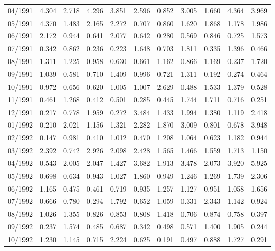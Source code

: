 \begin{tabular}{lrrrrrrrrrr}
04/1991 &  4.304 &  2.718 &  4.296 &  3.851 &  2.596 &  0.852 &  3.005 &  1.660 &  4.364 &  3.969 \\
05/1991 &  4.370 &  1.483 &  2.165 &  2.272 &  0.707 &  0.860 &  1.620 &  1.868 &  1.178 &  1.986 \\
06/1991 &  2.172 &  0.944 &  0.641 &  2.077 &  0.642 &  0.280 &  0.569 &  0.846 &  0.725 &  1.573 \\
07/1991 &  0.342 &  0.862 &  0.236 &  0.223 &  1.648 &  0.703 &  1.811 &  0.335 &  1.396 &  0.466 \\
08/1991 &  1.311 &  1.225 &  0.958 &  0.630 &  0.661 &  1.162 &  0.866 &  1.169 &  0.237 &  1.720 \\
09/1991 &  1.039 &  0.581 &  0.710 &  1.409 &  0.996 &  0.721 &  1.311 &  0.192 &  0.274 &  0.464 \\
10/1991 &  0.972 &  0.656 &  0.620 &  1.005 &  1.007 &  2.629 &  0.488 &  1.533 &  1.379 &  0.528 \\
11/1991 &  0.461 &  1.268 &  0.412 &  0.501 &  0.285 &  0.445 &  1.744 &  1.711 &  0.716 &  0.251 \\
12/1991 &  0.217 &  0.778 &  1.959 &  0.272 &  3.484 &  1.433 &  1.994 &  1.380 &  1.119 &  2.418 \\
01/1992 &  0.210 &  2.021 &  1.156 &  1.321 &  2.282 &  1.870 &  3.009 &  0.801 &  0.678 &  3.948 \\
02/1992 &  0.147 &  0.981 &  0.410 &  1.012 &  0.470 &  1.208 &  1.064 &  0.623 &  1.182 &  0.944 \\
03/1992 &  2.392 &  0.742 &  2.926 &  2.098 &  2.428 &  1.565 &  1.466 &  1.559 &  1.713 &  1.150 \\
04/1992 &  0.543 &  2.005 &  2.047 &  1.427 &  3.682 &  1.913 &  3.478 &  2.073 &  3.920 &  5.925 \\
05/1992 &  0.698 &  0.634 &  0.943 &  1.027 &  1.860 &  0.949 &  1.246 &  1.269 &  1.739 &  2.306 \\
06/1992 &  1.165 &  0.475 &  0.461 &  0.719 &  0.935 &  1.257 &  1.127 &  0.951 &  1.058 &  1.656 \\
07/1992 &  0.666 &  0.780 &  0.294 &  1.792 &  0.652 &  1.059 &  0.331 &  2.343 &  1.142 &  0.924 \\
08/1992 &  1.026 &  1.355 &  0.826 &  0.853 &  0.808 &  1.418 &  0.706 &  0.874 &  0.758 &  0.397 \\
09/1992 &  0.237 &  1.574 &  0.485 &  0.687 &  0.342 &  0.498 &  0.571 &  1.400 &  1.905 &  0.244 \\
10/1992 &  1.230 &  1.145 &  0.715 &  2.224 &  0.625 &  0.191 &  0.497 &  0.888 &  1.727 &  0.291 \\

\end{tabular}
